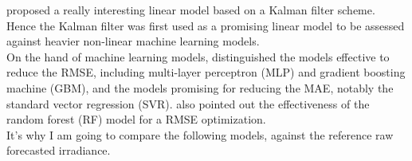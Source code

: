 \cite{suksamosorn_post-processing_2021} proposed a really interesting linear model based on a Kalman filter scheme. Hence the Kalman filter was first used as a promising linear model to be 
assessed against heavier non-linear machine learning models.\\

On the hand of machine learning models, \cite{verbois_statistical_2022} distinguished the models effective to reduce the RMSE, including multi-layer perceptron (MLP) and gradient boosting machine (GBM),
and the models promising for reducing the MAE, notably the standard vector regression (SVR).
\cite{suksamosorn_post-processing_2021} also pointed out the effectiveness of the random forest (RF) model for a RMSE optimization.\\

It's why I am going to compare the following models, against the reference raw forecasted irradiance.
